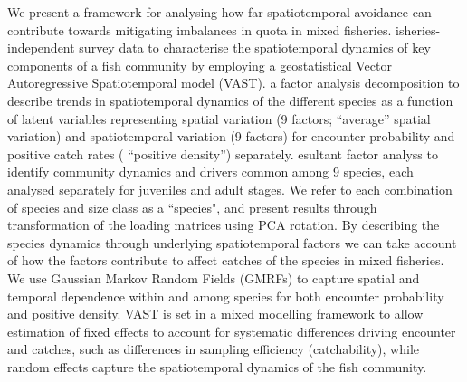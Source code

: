 \documentclass[fleqn,10pt]{wlscirep}
\begin{document}
\begin{linenumbers}
We present a framework for analysing how far spatiotemporal avoidance can
contribute towards mitigating imbalances in quota in mixed fisheries. isheries-independent survey data  to characterise the spatiotemporal dynamics
of key components of a fish community by employing a geostatistical Vector
Autoregressive Spatiotemporal model (VAST).   a factor analysis
decomposition to describe trends in spatiotemporal dynamics of the different
species as a function of latent variables\cite{Thorson2015} representing
spatial variation (9 factors;  ``average'' spatial variation) and
spatiotemporal variation (9 factors) for encounter probability and positive
catch rates ( ``positive density'') separately\cite{Thorson2015a}.
esultant factor
analyss  to identify community dynamics and drivers
common among 9 species, each analysed separately for juveniles and adult
stages.  We refer to each combination of species and size class as a ``species", and present results through transformation of
the loading matrices using PCA rotation.  By describing the species
dynamics through underlying  spatiotemporal
factors we can take account of how the factors contribute to affect catches of
the species in mixed fisheries.  We use Gaussian Markov Random Fields (GMRFs)
to capture spatial and temporal dependence within and among
species for both encounter probability and positive
density\cite{Thorson2013}. VAST is set in a mixed modelling framework to allow
estimation of fixed effects to account for systematic differences driving
encounter and catches, such as differences in sampling efficiency (catchability), while random effects capture the spatiotemporal dynamics of the
fish community.\\


\end{linenumbers}
\end{document}
